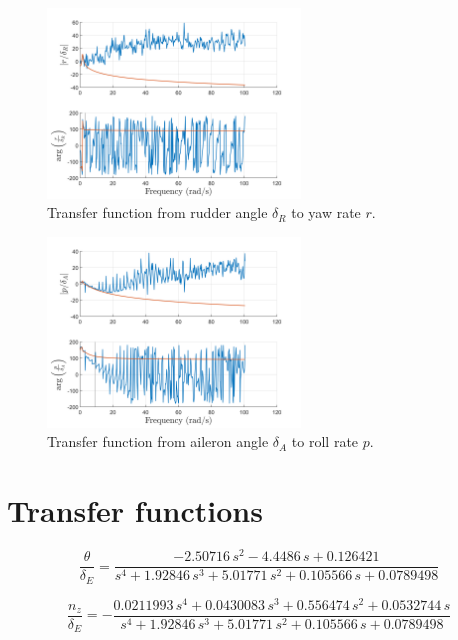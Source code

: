 \documentclass{article}
\begin{document}
\begin{figure}[H]
      \centering
      \includegraphics[width=0.6\textwidth]{rudder_to_yawrate.png}
      \caption{Transfer function from rudder angle $\delta_R$ to yaw rate $r$.}
      \label{fig:rudder_to_yawrate}
\end{figure}
  
\begin{figure}[H]
      \centering
      \includegraphics[width=0.6\textwidth]{aileron_to_rollrate.png}
      \caption{Transfer function from aileron angle $\delta_A$ to roll rate $p$.}
      \label{fig:aileron_to_rollrate}
\end{figure}

\section{Transfer functions}

\begin{equation}
    \frac{\theta}{\delta_E} =
    \frac{-2.50716\,s^2-4.4486\,s+0.126421}{s^4+1.92846\,s^3+5.01771\,s^2+0.105566\,s+0.0789498}
\end{equation}

\begin{equation}
    \frac{n_z}{\delta_E} =
    -\frac{0.0211993\,s^4+0.0430083\,s^3+0.556474\,s^2+0.0532744\,s}{s^4+1.92846\,s^3+5.01771\,s^2+0.105566\,s+0.0789498}
\end{equation}
\end{document}
